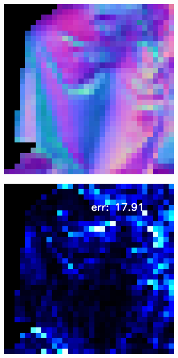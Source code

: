 \begin{figure}
\begin{subfigure}[b]{0.24\linewidth}
	\end{subfigure}
	\begin{subfigure}[b]{0.24\linewidth}
		\includegraphics[width=\linewidth]{./Figures/gcnn_synthetic/eval_3_normal_GCNN-GCNN.png}
	\end{subfigure}
	\begin{subfigure}[b]{0.24\linewidth}
		\includegraphics[width=\linewidth]{./Figures/gcnn_synthetic/eval_3_error_GCNN-GCNN.png}
	\end{subfigure}
	

\end{figure}
